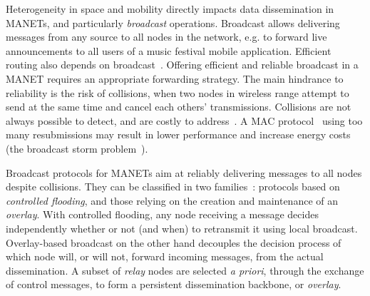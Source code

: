 
Heterogeneity in space and mobility directly impacts data dissemination in MANETs, and particularly \emph{broadcast} operations.
Broadcast allows delivering messages from any source to all nodes in the network, e.g. to forward live announcements to all users of a music festival mobile application.
Efficient routing also depends on broadcast~\citep{overview_adhoc_networks}.
Offering efficient and reliable broadcast in a MANET requires an appropriate forwarding strategy.
The main hindrance to reliability is the risk of collisions, when two nodes in wireless range attempt to send at the same time and cancel each others' transmissions.
Collisions are not always possible to detect, and are costly to address~\citep{hidden-terminal-problem}.
A MAC protocol~\citep{ieee1997wireless} using too many resubmissions may result in lower performance and increase energy costs (the broadcast storm problem~\citep{BroadcastStormProblem}).

Broadcast protocols for MANETs aim at reliably delivering messages to all nodes despite collisions. They can be classified in two families~\citep{ruiz2015survey}: protocols based on \emph{controlled flooding}, and those relying on the creation and maintenance of an \emph{overlay}.
%
With controlled flooding, any node receiving a message decides independently whether or not (and when) to retransmit it using local broadcast. %
%
Overlay-based broadcast on the other hand decouples the decision process of which node will, or will not, forward incoming messages, from the actual dissemination.
A subset of \emph{relay} nodes are selected \emph{a priori}, through the exchange of control messages, to form a persistent dissemination backbone, or \emph{overlay}.


